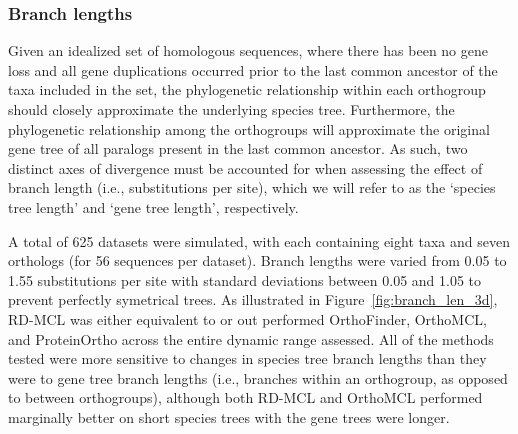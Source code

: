 \documentclass[twocolumn]{bmcart}  %
\begin{document}
\subsubsection{Branch lengths}
Given an idealized set of homologous sequences, where there has been no gene loss and all gene duplications occurred prior to the last common ancestor of the taxa included in the set, the phylogenetic relationship within each orthogroup should closely approximate the underlying species tree.
Furthermore, the phylogenetic relationship among the orthogroups will approximate the original gene tree of all paralogs present in the last common ancestor.
As such, two distinct axes of divergence must be accounted for when assessing the effect of branch length (i.e., substitutions per site), which we will refer to as the `species tree length' and `gene tree length', respectively.


A total of 625 datasets were simulated, with each containing eight taxa and seven orthologs (for 56 sequences per dataset).
Branch lengths were varied from 0.05 to 1.55 substitutions per site with standard deviations between 0.05 and 1.05 to prevent perfectly symetrical trees.
As illustrated in Figure~\ref{fig:branch_len_3d}, RD-MCL was either equivalent to or out performed OrthoFinder, OrthoMCL, and ProteinOrtho across the entire dynamic range assessed.
All of the methods tested were more sensitive to changes in species tree branch lengths than they were to gene tree branch lengths (i.e., branches within an orthogroup, as opposed to between orthogroups), although both RD-MCL and OrthoMCL performed marginally better on short species trees with the gene trees were longer.
\end{document}
